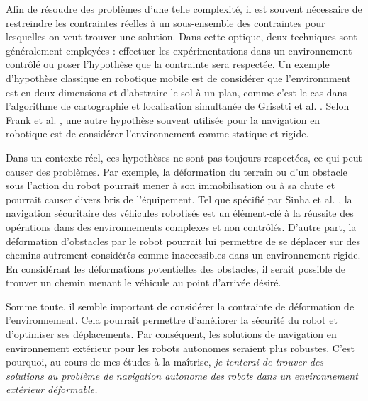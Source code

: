 \documentclass[12pt, letterpaper]{article} %
\begin{document}
Afin de résoudre des problèmes d'une telle complexité, il est souvent nécessaire de restreindre les contraintes réelles à un sous-ensemble des contraintes pour lesquelles on veut trouver une solution. Dans cette optique, deux techniques sont généralement employées : effectuer les expérimentations dans un environnement contrôlé ou poser l'hypothèse que la contrainte sera respectée. Un exemple d'hypothèse classique en robotique mobile est de considérer que l'environnment est en deux dimensions et d'abstraire le sol à un plan, comme c'est le cas dans l'algorithme de cartographie et localisation simultanée de Grisetti et al. \cite{Grisetti2007}. Selon Frank et al. \cite{Frank2011}, une autre hypothèse souvent utilisée pour la navigation en robotique est de considérer l'environnement comme statique et rigide. 

Dans un contexte réel, ces hypothèses ne sont pas toujours respectées, ce qui peut causer des problèmes. Par exemple, la déformation du terrain ou d'un obstacle sous l'action du robot pourrait mener à son immobilisation ou à sa chute et pourrait causer divers bris de l'équipement. Tel que spécifié par Sinha et al. \cite{Sinha2013}, la navigation sécuritaire des véhicules robotisés est un élément-clé à la réussite des opérations dans des environnements complexes et non contrôlés. D'autre part, la déformation d'obstacles par le robot pourrait lui permettre de se déplacer sur des chemins autrement considérés comme inaccessibles dans un environnement rigide. En considérant les déformations potentielles des obstacles, il serait possible de trouver un chemin menant le véhicule au point d'arrivée désiré.   

Somme toute, il semble important de considérer la contrainte de déformation de l'environnement. Cela pourrait permettre d'améliorer la sécurité du robot et d'optimiser ses déplacements. Par conséquent, les solutions de navigation en environnement extérieur pour les robots autonomes seraient plus robustes. C'est pourquoi, au cours de mes études à la maîtrise, \emph{je tenterai de trouver des solutions au problème de navigation autonome des robots dans un environnement extérieur déformable.}
\end{document}
